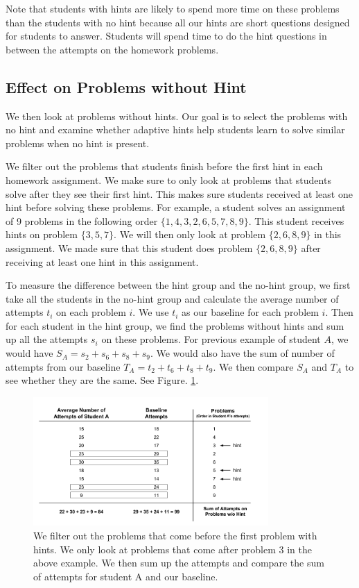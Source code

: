\documentclass{llncs}
\begin{document}
Note that students with hints are likely to spend more time on these problems than the students with no hint because all our hints are short questions designed for students to answer. Students will spend time to do the hint questions in between the attempts on the homework problems.

\subsection{Effect on Problems without Hint}
We then look at problems without hints. Our goal is to select the problems with no hint and examine whether adaptive hints help students learn to solve similar problems when no hint is present.

We filter out the problems that students finish before the first hint in each homework assignment. We make sure to only look at problems that students solve after they see their first hint. This makes sure students received at least one hint before solving these problems. For example, a student solves an assignment of 9 problems in the following order $\{ 1, 4, 3, 2, 6, 5, 7, 8, 9\}$. This student receives hints on problem $\{3, 5, 7\}$. We will then only look at problem $\{2, 6, 8, 9\}$ in this assignment. We made sure that this student does problem $\{2, 6, 8, 9\}$ after receiving at least one hint in this assignment.

To measure the difference between the hint group and the no-hint group, we first take all the students in the no-hint group and calculate the average number of attempts $t_i$ on each problem $i$. We use $t_i$ as our baseline for each problem $i$. Then for each student in the hint group, we find the problems without hints and sum up all the attempts $s_i$ on these problems. For previous example of student $A$, we would have $S_A = s_2 + s_6 + s_8 + s_9$. We would also have the sum of number of attempts from our baseline $T_A = t_2 + t_6 + t_8 + t_9$. We then compare $S_A$ and $T_A$ to see whether they are the same. See Figure. \ref{fig:pro_no_hint}.

\begin{figure}[ht]
   \centering
   \includegraphics[width=0.8\textwidth]{image/Filter_problems.png}
   \caption{We filter out the problems that come before the first problem with hints. We only look at problems that come after problem 3 in the above example. We then sum up the attempts and compare the sum of attempts for student A and our baseline.}
   \label{fig:pro_no_hint}
\end{figure}
\end{document}
